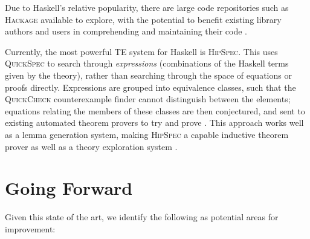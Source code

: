 \documentclass[]{article}
\begin{document}
Due to Haskell's relative popularity, there are large code repositories
such as \textsc{Hackage} available to explore, with the potential to
benefit existing library authors and users in comprehending and
maintaining their code \cite{QuickSpec}.

Currently, the most powerful TE system for Haskell is \textsc{HipSpec}.
This uses \textsc{QuickSpec} to search through \emph{expressions}
(combinations of the Haskell terms given by the theory), rather than
searching through the space of equations or proofs directly. Expressions
are grouped into equivalence classes, such that the \textsc{QuickCheck}
counterexample finder cannot distinguish between the elements; equations
relating the members of these classes are then conjectured, and sent to
existing automated theorem provers to try and prove \cite{rosen2012proving}. This
approach works well as a lemma generation system, making
\textsc{HipSpec} a capable inductive theorem prover as well as a theory
exploration system \cite{claessen2013automating}.

\section{Going Forward}\label{going-forward}

Given this state of the art, we identify the following as potential
areas for improvement:
\end{document}
